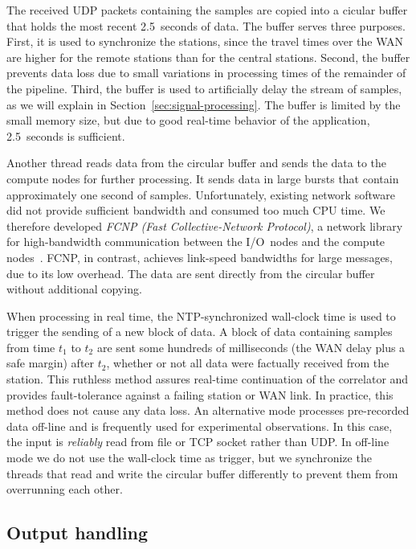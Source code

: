 \documentclass{sig-alternate}
\begin{document}
The received UDP packets containing the samples are copied into a cicular buffer that holds the most recent
2.5~seconds of data.
The buffer serves three purposes.
First, it is used to synchronize the stations, since the travel times over
the WAN are higher for the remote stations than for the central stations.
Second, the buffer prevents data loss due to small variations in processing
times of the remainder of the pipeline.
Third, the buffer is used to artificially delay the stream of samples,
as we will explain in Section~\ref{sec:signal-processing}.
The buffer is limited by the small memory size, but due to good real-time
behavior of the application, 2.5~seconds is sufficient.

Another thread reads data from the circular buffer and sends the data to
the compute nodes for further processing.
It sends data in large bursts that contain approximately one second of samples.
Unfortunately, existing network software did not provide sufficient bandwidth
and consumed too much CPU time.
We therefore developed \emph{FCNP (Fast Collective-Network Protocol)}, a 
network library for high-bandwidth communication between the I/O~nodes and the
compute nodes~\cite{Romein:09a}.
FCNP, in contrast, achieves link-speed bandwidths for large messages, due to
its low overhead.
The data are sent directly from the circular buffer without additional copying.

When processing in real time, the NTP-synchronized wall-clock time
is used to trigger the sending of a new block of data.
A block of data containing samples from time $t_1$ to $t_2$ are sent some hundreds
of milliseconds (the WAN delay plus a safe margin) after $t_2$, whether or
not all data were factually received from the station.
This ruthless method assures real-time continuation of the correlator and
provides fault-tolerance against a failing station or WAN link.
In practice, this method does not cause any data loss.
An alternative mode processes pre-recorded data off-line and is frequently used
for experimental observations.
In this case, the input is \emph{reliably} read from file or TCP socket rather than
UDP.
In off-line mode we do not use the wall-clock time as
trigger, but we synchronize the threads that read and write the circular
buffer differently to prevent them from overrunning each other.


\subsection{Output handling}
\end{document}
